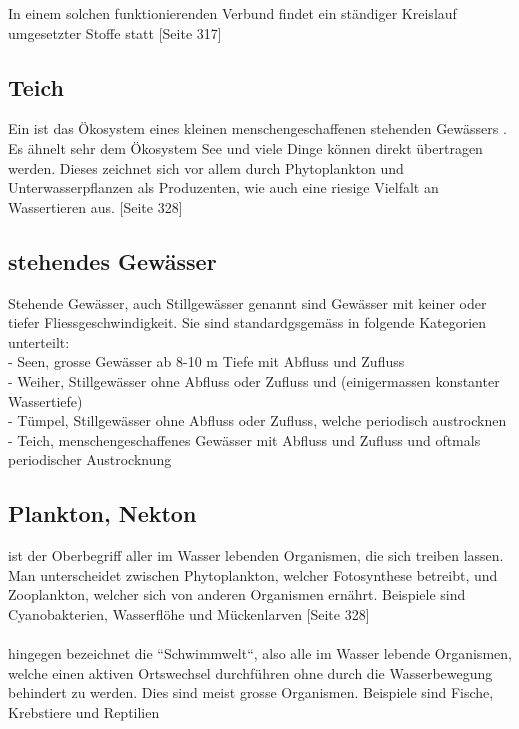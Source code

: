 \documentclass{article}
\begin{document}
        In einem solchen funktionierenden Verbund findet ein ständiger Kreislauf umgesetzter Stoffe statt \cite{Biobuch} [Seite 317]
        
    \subsection{Teich}
    
       Ein  ist das Ökosystem eines kleinen menschengeschaffenen stehenden Gewässers \cite{Duden}. Es ähnelt sehr dem Ökosystem See und viele Dinge können direkt übertragen werden. \cite{Kleingewasserkunde} Dieses zeichnet sich vor allem durch Phytoplankton und Unterwasserpflanzen als Produzenten, wie auch eine riesige Vielfalt an Wassertieren aus. \cite{Biobuch} [Seite 328]
    
    \subsection{stehendes Gewässer}
    
        Stehende Gewässer, auch Stillgewässer genannt sind Gewässer mit keiner oder tiefer Fliessgeschwindigkeit. Sie sind standardgsgemäss in folgende Kategorien unterteilt: \\
        
        - Seen, grosse Gewässer ab 8-10 m Tiefe mit Abfluss und Zufluss \\
        - Weiher, Stillgewässer ohne Abfluss oder Zufluss und (einigermassen konstanter Wassertiefe) \\
        - Tümpel, Stillgewässer ohne Abfluss oder Zufluss, welche periodisch austrocknen \\
        - Teich, menschengeschaffenes Gewässer mit Abfluss und Zufluss und oftmals periodischer Austrocknung \\ \cite{Kleingewasserkunde}
    
    \subsection{Plankton, Nekton}
    
         ist der Oberbegriff aller im Wasser lebenden Organismen, die sich treiben lassen. Man unterscheidet zwischen Phytoplankton, welcher Fotosynthese betreibt, und Zooplankton, welcher sich von anderen Organismen ernährt. Beispiele sind Cyanobakterien, Wasserflöhe und Mückenlarven \cite{Biobuch} [Seite 328] \\ \\
        \vspace{5mm}
         hingegen bezeichnet die ``Schwimmwelt``, also alle im Wasser lebende Organismen, welche einen aktiven Ortswechsel durchführen ohne durch die Wasserbewegung behindert zu werden. Dies sind meist grosse Organismen. Beispiele sind Fische, Krebstiere und Reptilien \cite{Spektrum} \cite{Was}
    
\end{document}
